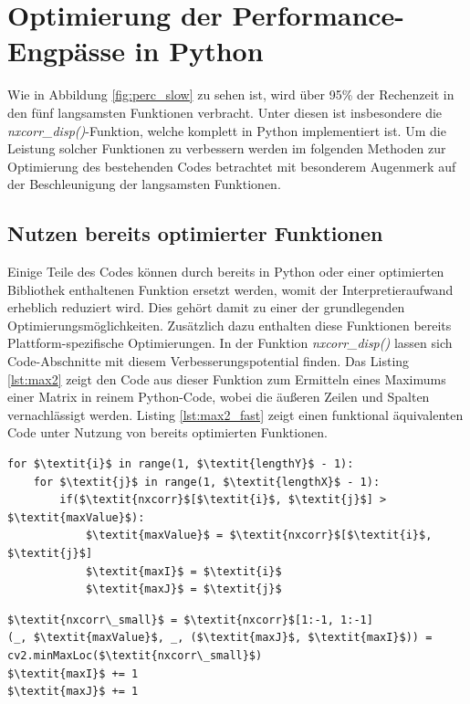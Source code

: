 \section{Optimierung der Performance-Engpässe in Python}

Wie in Abbildung \ref{fig:perc_slow} zu sehen ist, wird über 95\% der Rechenzeit in den fünf langsamsten Funktionen verbracht. Unter diesen ist insbesondere die \textit{nxcorr\_disp()}-Funktion, welche komplett in Python implementiert ist. Um die Leistung solcher Funktionen zu verbessern werden im folgenden Methoden zur Optimierung des bestehenden Codes betrachtet mit besonderem Augenmerk auf der Beschleunigung der langsamsten Funktionen. 

\subsection{Nutzen bereits optimierter Funktionen}

Einige Teile des Codes können durch bereits in Python oder einer optimierten Bibliothek enthaltenen Funktion ersetzt werden, womit der Interpretieraufwand erheblich reduziert wird. Dies gehört damit zu einer der grundlegenden Optimierungsmöglichkeiten. Zusätzlich dazu enthalten diese Funktionen bereits Plattform-spezifische Optimierungen. In der Funktion \textit{nxcorr\_disp()} lassen sich Code-Abschnitte mit diesem Verbesserungspotential finden. Das Listing \ref{lst:max2} zeigt den Code aus dieser Funktion zum Ermitteln eines Maximums einer Matrix in reinem Python-Code, wobei die äußeren Zeilen und Spalten vernachlässigt werden. Listing \ref{lst:max2_fast} zeigt einen funktional äquivalenten Code unter Nutzung von bereits optimierten Funktionen. 

\begin{lstlisting}[caption={Finden des Maximums einer Matrix}, label={lst:max2}]
for $\textit{i}$ in range(1, $\textit{lengthY}$ - 1):
	for $\textit{j}$ in range(1, $\textit{lengthX}$ - 1):
		if($\textit{nxcorr}$[$\textit{i}$, $\textit{j}$] > $\textit{maxValue}$):
			$\textit{maxValue}$ = $\textit{nxcorr}$[$\textit{i}$, $\textit{j}$]
			$\textit{maxI}$ = $\textit{i}$
			$\textit{maxJ}$ = $\textit{j}$
\end{lstlisting}

\begin{lstlisting}[caption={Finden des Maximums einer Matrix mittels NumPy und OpenCV}, label={lst:max2_fast}]
$\textit{nxcorr\_small}$ = $\textit{nxcorr}$[1:-1, 1:-1]
(_, $\textit{maxValue}$, _, ($\textit{maxJ}$, $\textit{maxI}$)) = cv2.minMaxLoc($\textit{nxcorr\_small}$)
$\textit{maxI}$ += 1
$\textit{maxJ}$ += 1
\end{lstlisting}

